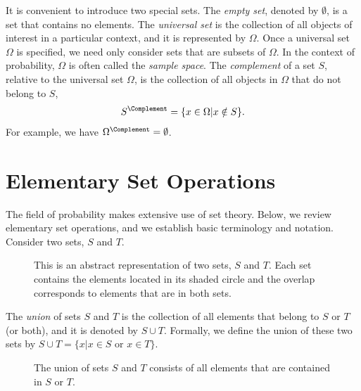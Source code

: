 It is convenient to introduce two special sets.
The \emph{empty set}, denoted by $\emptyset$, is a set that contains no elements.
The \emph{universal set} is the collection of all objects of interest in a particular context, and it is represented by $\Omega$.
Once a universal set $\Omega$ is specified, we need only consider sets that are subsets of $\Omega$.
In the context of probability, $\Omega$ is often called the \emph{sample space}.
The \emph{complement} of a set $S$, relative to the universal set $\Omega$, is the collection of all objects in $\Omega$ that do not belong to $S$,
\begin{equation*}
S^{\Complement} = \{ x \in \Omega | x \notin S \}.
\end{equation*}
For example, we have $\Omega^{\Complement} = \emptyset$.


\section{Elementary Set Operations}

The field of probability makes extensive use of set theory.
Below, we review elementary set operations, and we establish basic terminology and notation.
Consider two sets, $S$ and $T$.

\begin{figure}[htb!]
\begin{center}
\caption{This is an abstract representation of two sets, $S$ and $T$.
Each set contains the elements located in its shaded circle and the overlap corresponds to elements that are in both sets.}
\end{center}
\end{figure}

The \emph{union} of sets $S$ and $T$ is the collection of all elements that belong to $S$ or $T$ (or both), and it is denoted by $S \cup T$.
Formally, we define the union of these two sets by $S \cup T = \{ x | x \in S \text{ or } x \in T \}$.

\begin{figure}[htb!]
\begin{center}
\caption{The union of sets $S$ and $T$ consists of all elements that are contained in $S$ or $T$.}
\end{center}
\end{figure}

